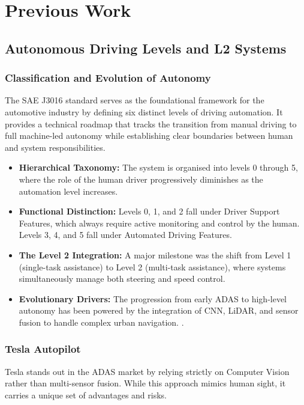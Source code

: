 \documentclass[12pt, a4paper]{report}
\begin{document}
\section{Previous Work}

\subsection{Autonomous Driving Levels and L2 Systems}

\subsubsection{Classification and Evolution of Autonomy}

The \ac{SAE} J3016 standard serves as the foundational framework for the automotive industry by defining six distinct levels of driving automation. It provides a technical roadmap that tracks the transition from manual driving to full machine-led autonomy while establishing clear boundaries between human and system responsibilities.

\begin{itemize}
    \item \textbf{Hierarchical Taxonomy:} The system is organised into levels 0 through 5, where the role of the human driver progressively diminishes as the automation level increases.
    \item \textbf{Functional Distinction:} Levels 0, 1, and 2 fall under Driver Support Features, which always require active monitoring and control by the human. Levels 3, 4, and 5 fall under Automated Driving Features.
    \item \textbf{The Level 2 Integration:} A major milestone was the shift from Level 1 (single-task assistance) to Level 2 (multi-task assistance), where systems simultaneously manage both steering and speed control.
    \item \textbf{Evolutionary Drivers:} The progression from early \ac{ADAS} to high-level autonomy has been powered by the integration of \ac{CNN}, \ac{LiDAR}, and sensor fusion to handle complex urban navigation. \cite{ref1}.
\end{itemize}

\subsubsection{Tesla Autopilot}

Tesla stands out in the \ac{ADAS} market by relying strictly on Computer Vision rather than multi-sensor fusion. While this approach mimics human sight, it carries a unique set of advantages and risks.
\end{document}
